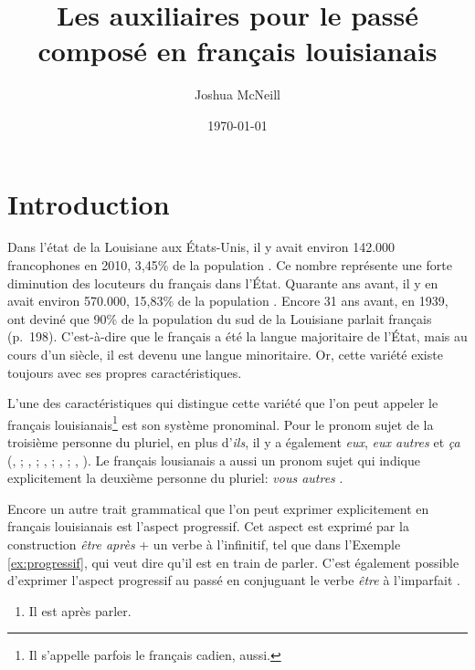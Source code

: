 \documentclass{article}
\author{Joshua McNeill}
\date{\today}
\title{Les auxiliaires pour le passé composé en français louisianais}
\newcommand{\lexi}[1]{\textit{#1}}
\begin{document}
  \maketitle
  \section{Introduction}
    Dans l'état de la Louisiane aux États-Unis, il y avait environ 142.000 francophones en 2010, 3,45\% de la population \parencite{mla_louisiana_nodate}.
    Ce nombre représente une forte diminution des locuteurs du français dans l'État.
    Quarante ans avant, il y en avait environ 570.000, 15,83\% de la population \parencite[p.~159]{us_department_of_commerce_1970_1973}.
    Encore 31 ans avant, en 1939, \textcite{smith_influence_1939} ont deviné que 90\% de la population du sud de la Louisiane parlait français (p.~198).
    C'est-à-dire que le français a été la langue majoritaire de l'État, mais au cours d'un siècle, il est devenu une langue minoritaire.
    Or, cette variété existe toujours avec ses propres caractéristiques.

    L'une des caractéristiques qui distingue cette variété que l'on peut appeler le français louisianais\footnote{Il s'appelle parfois le français cadien, aussi.} est son système pronominal.
    Pour le pronom sujet de la troisième personne du pluriel, en plus d'\lexi{ils}, il y a également \lexi{eux}, \lexi{eux autres} et \lexi{ça} (\citeauthor{brown_pronominal_1988}, \citeyear[pp.~152-153]{brown_pronominal_1988}; \citeauthor{byers_defining_1988}, \citeyear[pp.~88-92]{byers_defining_1988}; \citeauthor{dajko_ethnic_2009}, \citeyear[p.~144]{dajko_ethnic_2009}; \citeauthor{rottet_language_1995}, \citeyear[p.~175]{rottet_language_1995}; \citeauthor{smith_morphosyntactic_1994}, \citeyear[p.~60]{smith_morphosyntactic_1994}).
    Le français lousianais a aussi un pronom sujet qui indique explicitement la deuxième personne du pluriel: \lexi{vous autres} \parencite[p.~175]{rottet_language_1995}.

    Encore un autre trait grammatical que l'on peut exprimer explicitement en français louisianais est l'aspect progressif.
    Cet aspect est exprimé par la construction \lexi{être après} + un verbe à l'infinitif, tel que dans l'Exemple \ref{ex:progressif}, qui veut dire qu'il est en train de parler.
    C'est également possible d'exprimer l'aspect progressif au passé en conjuguant le verbe \lexi{être} à l'imparfait \parencite[p.~102]{papen_structural_1997}.

    \begin{enumerate}
      \item \label{ex:progressif} Il est après parler.
    \end{enumerate}
\end{document}

